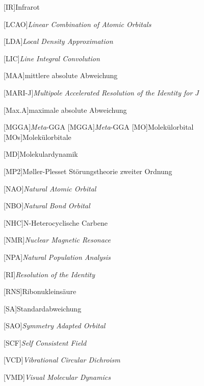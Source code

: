 \begin{acronym}[SEPSEP]
	[IR]{Infrarot}
		
	[LCAO]{\textit{Linear Combination of Atomic Orbitals}}
	
	[LDA]{\textit{Local Density Approximation}}
	
	[LIC]{\textit{Line Integral Convolution}}
	
	[MAA]{mittlere absolute Abweichung}
     
    [MARI-J]{\textit{Multipole Accelerated Resolution of the Identity for $J$}}
    
    [Max.A]{maximale absolute Abweichung} 	
 	
	[MGGA]{\textit{Meta}-GGA}   
		{\textit{Meta}-GGA}	
	[MO]{Molekülorbital}   
		[MOs]{Molekülorbitale}
		
	[MD]{Molekulardynamik}
	
	[MP2]{M\o ller-Plesset Störungstheorie zweiter Ordnung}
		
    [NAO]{\textit{Natural Atomic Orbital}}

    [NBO]{\textit{Natural Bond Orbital}}
    
    [NHC]{N-Heterocyclische Carbene}
    
    [NMR]{\textit{Nuclear Magnetic Resonace}}
        
    [NPA]{\textit{Natural Population Analysis}}
      
    [RI]{\textit{Resolution of the Identity}}
    
    [RNS]{Ribonukleinsäure}
    
    [SA]{Standardabweichung}
    
    [SAO]{\textit{Symmetry Adapted Orbital}}
    
	[SCF]{\textit{Self Consistent Field}}   
		
	[VCD]{\textit{Vibrational Circular Dichroism}}
     
    [VMD]{\textit{Visual Molecular Dynamics}}
\end{acronym}
